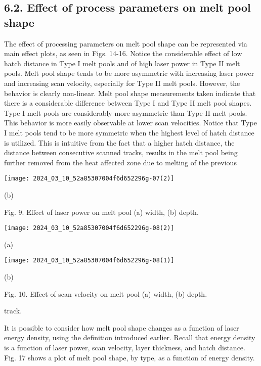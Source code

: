 \documentclass[10pt]{article}
\begin{document}
\subsection*{6.2. Effect of process parameters on melt pool shape}
The effect of processing parameters on melt pool shape can be represented via main effect plots, as seen in Figs. 14-16. Notice the considerable effect of low hatch distance in Type I melt pools and of high laser power in Type II melt pools. Melt pool shape tends to be more asymmetric with increasing laser power and increasing scan velocity, especially for Type II melt pools. However, the behavior is clearly non-linear. Melt pool shape measurements taken indicate that there is a considerable difference between Type I and Type II melt pool shapes. Type I melt pools are considerably more asymmetric than Type II melt pools. This behavior is more easily observable at lower scan velocities. Notice that Type I melt pools tend to be more symmetric when the highest level of hatch distance is utilized. This is intuitive from the fact that a higher hatch distance, the distance between consecutive scanned tracks, results in the melt pool being further removed from the heat affected zone due to melting of the previous

\begin{center}
\texttt{[image: 2024\_03\_10\_52a85307004f6d652296g-07(2)]}
\end{center}

(b)

Fig. 9. Effect of laser power on melt pool (a) width, (b) depth.

\begin{center}
\texttt{[image: 2024\_03\_10\_52a85307004f6d652296g-08(2)]}
\end{center}

(a)

\begin{center}
\texttt{[image: 2024\_03\_10\_52a85307004f6d652296g-08(1)]}
\end{center}

(b)

Fig. 10. Effect of scan velocity on melt pool (a) width, (b) depth.

track.

It is possible to consider how melt pool shape changes as a function of laser energy density, using the definition introduced earlier. Recall that energy density is a function of laser power, scan velocity, layer thickness, and hatch distance. Fig. 17 shows a plot of melt pool shape, by type, as a function of energy density.
\end{document}
